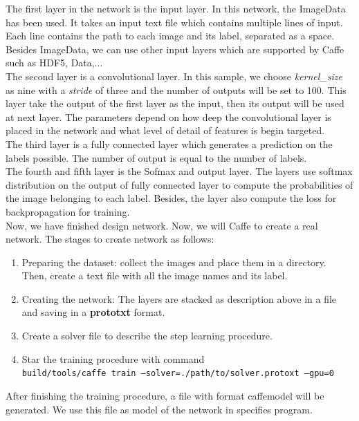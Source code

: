The first layer in the network is the input layer. In this network, the ImageData has been used. It takes an input text file which contains multiple lines of input. Each line contains the path to each image and its label, separated as a space. Besides ImageData, we can use other input layers which are supported by Caffe such as HDF5, Data,...\\[0.2cm]

The second layer is a convolutional layer. In this sample, we choose \textit{kernel\_size} as nine with a \textit{stride} of three and the number of outputs will be set to 100. This layer take the output of the first layer as the input, then its output will be used at next layer. The parameters depend on how deep the convolutional layer is placed in the network and what level of detail of features is begin targeted.\\[0.2cm]

The third layer is a fully connected layer which generates a prediction on the labels possible. The number of output is equal to the number of labels.\\[0.2cm]

The fourth and fifth layer is the Sofmax and output layer. The layers use softmax distribution on the output of fully connected layer to compute the probabilities of the image belonging to each label. Besides, the layer also compute the loss for backpropagation for training.\\[0.2cm]

Now, we have finished design network. Now, we will Caffe to create a real network. The stages to create network as follows:
\begin{enumerate}
	\item Preparing the dataset: collect the images and place them in a directory. Then, create a text file with all the image names and its label.
	\item Creating the network: The layers are stacked as description above in a file and saving in a \textbf{prototxt} format.
	\item Create a solver file to describe the step learning procedure.
	\item Star the training procedure with command \\
	\texttt{build/tools/caffe train --solver=./path/to/solver.protoxt --gpu=0}
\end{enumerate}
After finishing the training procedure, a file with format caffemodel will be generated. We use this file as model of the network in specifies program.